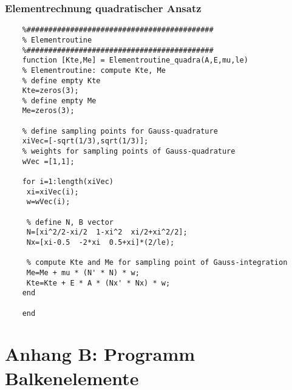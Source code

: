 	\subsubsection*{Elementrechnung quadratischer Ansatz}
	\begin{lstlisting}
	%###########################################
	% Elementroutine
	%###########################################
	function [Kte,Me] = Elementroutine_quadra(A,E,mu,le)
	% Elementroutine: compute Kte, Me
	% define empty Kte
	Kte=zeros(3); 
	% define empty Me 
	Me=zeros(3);
	
	% define sampling points for Gauss-quadrature
	xiVec=[-sqrt(1/3),sqrt(1/3)]; 
	% weights for sampling points of Gauss-quadrature 
	wVec =[1,1];   
	
	for i=1:length(xiVec)
	 xi=xiVec(i);
	 w=wVec(i);
	
	 % define N, B vector 
	 N=[xi^2/2-xi/2  1-xi^2  xi/2+xi^2/2];
	 Nx=[xi-0.5  -2*xi  0.5+xi]*(2/le);
	
	 % compute Kte and Me for sampling point of Gauss-integration
	 Me=Me + mu * (N' * N) * w;
	 Kte=Kte + E * A * (Nx' * Nx) * w;
	end
	
	end
	\end{lstlisting}
	
	\clearpage
	
	\setcounter{page}{1} 
	
	\section*{Anhang B: Programm Balkenelemente}
